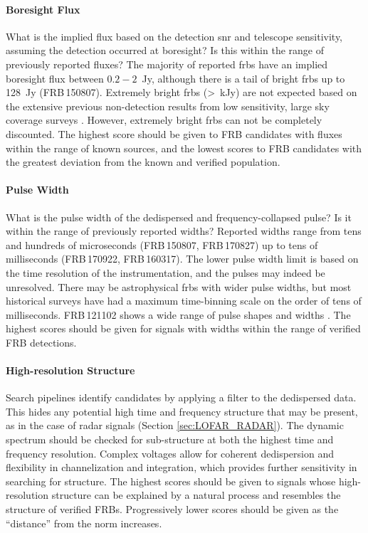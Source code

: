\documentclass[a4paper,fleqn,usenatbib]{mnras}
\begin{document}
\paragraph{Boresight Flux}

What is the implied flux based on the detection \gls{snr} and telescope
sensitivity, assuming the detection occurred at boresight?  Is this within the
range of previously reported fluxes? The majority of reported \glspl{frb} have
an implied boresight flux between $0.2-2$~Jy, although there is a tail of bright
\glspl{frb} up to 128~Jy (FRB\,150807). Extremely bright \glspl{frb} (>~kJy) are
not expected based on the extensive previous non-detection results from low
sensitivity, large sky coverage surveys
\citep{2012ApJ...744..109S,2015MNRAS.452.1254K,2016MNRAS.458.3506R}. However,
extremely bright \glspl{frb} can not be completely discounted. The highest score
should be given to FRB candidates with fluxes within the range of known sources,
and the lowest scores to FRB candidates with the greatest deviation from the
known and verified population.

\paragraph{Pulse Width}

What is the pulse width of the dedispersed and frequency-collapsed pulse? Is it
within the range of previously reported widths? Reported widths range from tens
and hundreds of microseconds (FRB\,150807, FRB\,170827) up to tens of
milliseconds (FRB\,170922, FRB\,160317). The lower pulse width limit is based on
the time resolution of the instrumentation, and the pulses may indeed be
unresolved.  There may be astrophysical \glspl{frb} with wider pulse widths, but
most historical surveys have had a maximum time-binning scale on the order of
tens of milliseconds. FRB\,121102 shows a wide range of pulse shapes and widths
\citep{2018Natur.553..182M,atel10675}. The highest scores should be given for
signals with widths within the range of verified FRB detections.

\paragraph{High-resolution Structure}

Search pipelines identify candidates by applying a filter to the dedispersed
data. This hides any potential high time and frequency structure that may be
present, as in the case of radar signals (Section \ref{sec:LOFAR_RADAR}). The
dynamic spectrum should be checked for sub-structure at both the highest time
and frequency resolution. Complex voltages allow for coherent dedispersion and
flexibility in channelization and integration, which provides further
sensitivity in searching for structure. The highest scores should be given to
signals whose high-resolution structure can be explained by a natural process
and resembles the structure of verified FRBs. Progressively lower scores should
be given as the ``distance'' from the norm increases.
\end{document}
